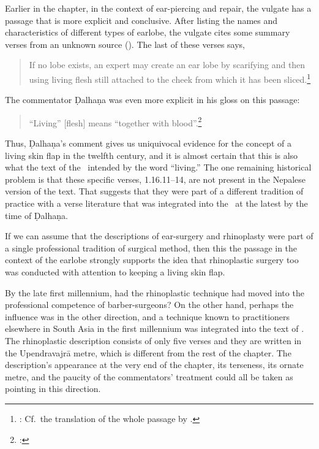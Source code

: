 Earlier in the chapter, in the context of ear-piercing and repair, the vulgate has a passage 
that is more explicit and conclusive.  After listing the names and characteristics of different 
types of earlobe, the vulgate cites some summary verses from an unknown source 
().  The last of these verses says,
    \begin{quote}
            If no lobe exists, an expert may create an ear lobe by scarifying and
then using living flesh still attached to the cheek from which it has
been sliced.\footnote{:  
    Cf.\ the translation of the whole passage by \citet{wuja-2003}.}
    \end{quote}
The commentator Ḍalhaṇa was even more explicit in his gloss on this passage:
\begin{quote}
    “Living” [flesh] means “together with blood”.\footnote{:
    }
\end{quote}
Thus, Ḍalhaṇa's comment gives us uniquivocal evidence for the concept of a living
skin flap in the twelfth century, and it is almost certain that this is also what
the text of the \SS\ intended by the word “living.”  The one remaining historical
problem is that these specific verses, 1.16.11--14, are not present in the
Nepalese version of the text.  That suggests that they were part of a different
tradition of practice with a verse literature that was integrated into the \SS\ at the
latest by the time of Ḍalhaṇa.

If we can assume that the descriptions of ear-surgery and rhinoplasty were part of
a single professional tradition of surgical method, then this the passage in the
context of the earlobe strongly supports the idea that rhinoplastic surgery too was
conducted with attention to keeping a living skin flap.

By the late first millennium, had the rhinoplastic technique had moved into the
professional competence of barber-surgeons?  On the other hand, perhaps the
influence was in the other direction, and a technique known to practitioners
elsewhere in South Asia in the first millennium was integrated into the text of
\SS. The rhinoplastic description consists of only five verses and they are written in the
Upendravajrā metre, which is different from the rest of the chapter.  The
description's appearance at the very end of the chapter, its terseness, its ornate
metre, and the paucity of the commentators' treatment could all be taken as
pointing in this direction.

